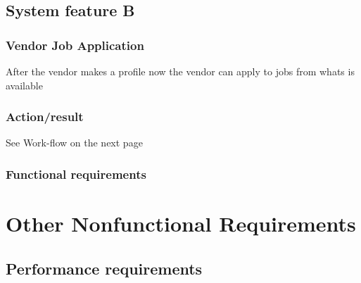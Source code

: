 \documentclass[10pt]{article}
\begin{document}
\lipsum[10]






\subsection{System feature B}

\subsubsection{Vendor Job Application}

After the vendor makes a profile now the vendor can apply to jobs from whats is available

\subsubsection{Action/result}

See Work-flow on the next page



\subsubsection{ Functional requirements}

\lipsum[10]








\section{Other Nonfunctional Requirements}

\subsection{Performance requirements}
\end{document}

